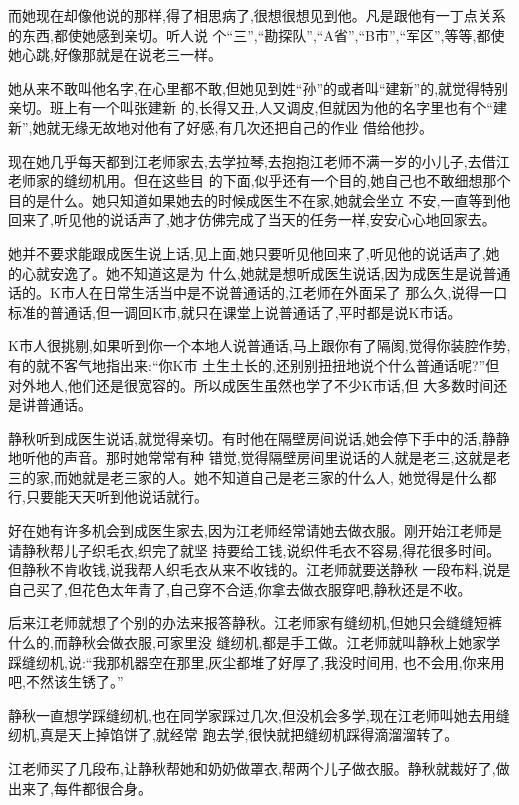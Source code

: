 ﻿\documentclass[12pt]{article}
\begin{document}
而她现在却像他说的那样,得了相思病了,很想很想见到他。凡是跟他有一丁点关系的东西,都使她感到亲切。听人说
个``三'',``勘探队'',``A省'',``B市'',``军区'',等等,都使她心跳,好像那就是在说老三一样。

她从来不敢叫他名字,在心里都不敢,但她见到姓``孙''的或者叫``建新''的,就觉得特别亲切。班上有一个叫张建新
的,长得又丑,人又调皮,但就因为他的名字里也有个``建新'',她就无缘无故地对他有了好感,有几次还把自己的作业
借给他抄。

现在她几乎每天都到江老师家去,去学拉琴,去抱抱江老师不满一岁的小儿子,去借江老师家的缝纫机用。但在这些目
的下面,似乎还有一个目的,她自己也不敢细想那个目的是什么。她只知道如果她去的时候成医生不在家,她就会坐立
不安,一直等到他回来了,听见他的说话声了,她才仿佛完成了当天的任务一样,安安心心地回家去。

她并不要求能跟成医生说上话,见上面,她只要听见他回来了,听见他的说话声了,她的心就安逸了。她不知道这是为
什么,她就是想听成医生说话,因为成医生是说普通话的。K市人在日常生活当中是不说普通话的,江老师在外面呆了
那么久,说得一口标准的普通话,但一调回K市,就只在课堂上说普通话了,平时都是说K市话。

K市人很挑剔,如果听到你一个本地人说普通话,马上跟你有了隔阂,觉得你装腔作势,有的就不客气地指出来:``你K市
土生土长的,还别别扭扭地说个什么普通话呢?''但对外地人,他们还是很宽容的。所以成医生虽然也学了不少K市话,但
大多数时间还是讲普通话。

静秋听到成医生说话,就觉得亲切。有时他在隔壁房间说话,她会停下手中的活,静静地听他的声音。那时她常常有种
错觉,觉得隔壁房间里说话的人就是老三,这就是老三的家,而她就是老三家的人。她不知道自己是老三家的什么人,
她觉得是什么都行,只要能天天听到他说话就行。

好在她有许多机会到成医生家去,因为江老师经常请她去做衣服。刚开始江老师是请静秋帮儿子织毛衣,织完了就坚
持要给工钱,说织件毛衣不容易,得花很多时间。但静秋不肯收钱,说我帮人织毛衣从来不收钱的。江老师就要送静秋
一段布料,说是自己买了,但花色太年青了,自己穿不合适,你拿去做衣服穿吧,静秋还是不收。

后来江老师就想了个别的办法来报答静秋。江老师家有缝纫机,但她只会缝缝短裤什么的,而静秋会做衣服,可家里没
缝纫机,都是手工做。江老师就叫静秋上她家学踩缝纫机,说:``我那机器空在那里,灰尘都堆了好厚了,我没时间用,
也不会用,你来用吧,不然该生锈了。''

静秋一直想学踩缝纫机,也在同学家踩过几次,但没机会多学,现在江老师叫她去用缝纫机,真是天上掉馅饼了,就经常
跑去学,很快就把缝纫机踩得滴溜溜转了。

江老师买了几段布,让静秋帮她和奶奶做罩衣,帮两个儿子做衣服。静秋就裁好了,做出来了,每件都很合身。
\end{document}
